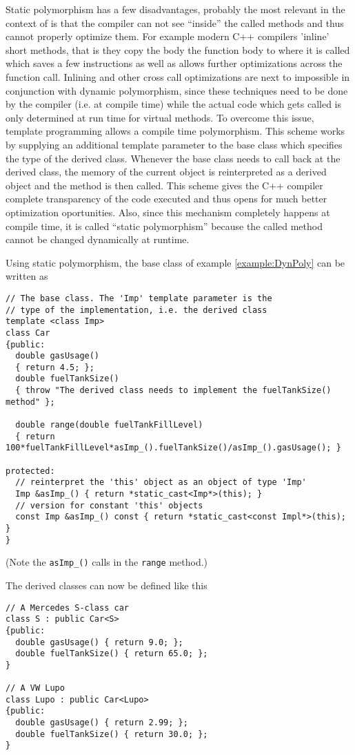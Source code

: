 Static polymorphism has a few disadvantages, probably the most
relevant in the context of \Dumux is that the compiler can not see
``inside'' the called methods and thus cannot properly optimize
them. For example modern C++ compilers 'inline' short methods, that is
they copy the body the function body to where it is called which saves
a few instructions as well as allows further optimizations across the
function call. Inlining and other cross call optimizations are next to
impossible in conjunction with dynamic polymorphism, since these
techniques need to be done by the compiler (i.e. at compile time)
while the actual code which gets called is only determined at run time
for virtual methods. To overcome this issue, template programming
allows a compile time polymorphism. This scheme works by supplying an
additional template parameter to the base class which specifies the
type of the derived class. Whenever the base class needs to call back
at the derived class, the memory of the current object is
reinterpreted as a derived object and the method is then called. This
scheme gives the C++ compiler complete transparency of the code
executed and thus opens for much better optimization
oportunities. Also, since this mechanism completely happens at compile
time, it is called ``static polymorphism'' because the called method
cannot be changed dynamically at runtime.
\begin{example}
  Using static polymorphism, the base class of example \ref{example:DynPoly}
  can be written as
\begin{verbatim}
// The base class. The 'Imp' template parameter is the
// type of the implementation, i.e. the derived class 
template <class Imp>
class Car
{public:
  double gasUsage() 
  { return 4.5; };
  double fuelTankSize() 
  { throw "The derived class needs to implement the fuelTankSize() method" };
  
  double range(double fuelTankFillLevel) 
  { return 100*fuelTankFillLevel*asImp_().fuelTankSize()/asImp_().gasUsage(); }

protected:
  // reinterpret the 'this' object as an object of type 'Imp'
  Imp &asImp_() { return *static_cast<Imp*>(this); }
  // version for constant 'this' objects
  const Imp &asImp_() const { return *static_cast<const Impl*>(this); }
}
\end{verbatim}
(Note the \texttt{asImp\_()} calls in the \texttt{range} method.)

The derived classes can now be defined like this
\begin{verbatim}
// A Mercedes S-class car
class S : public Car<S>
{public:
  double gasUsage() { return 9.0; };
  double fuelTankSize() { return 65.0; };
}

// A VW Lupo
class Lupo : public Car<Lupo>
{public:
  double gasUsage() { return 2.99; };
  double fuelTankSize() { return 30.0; };
}
\end{verbatim}
\end{example}


